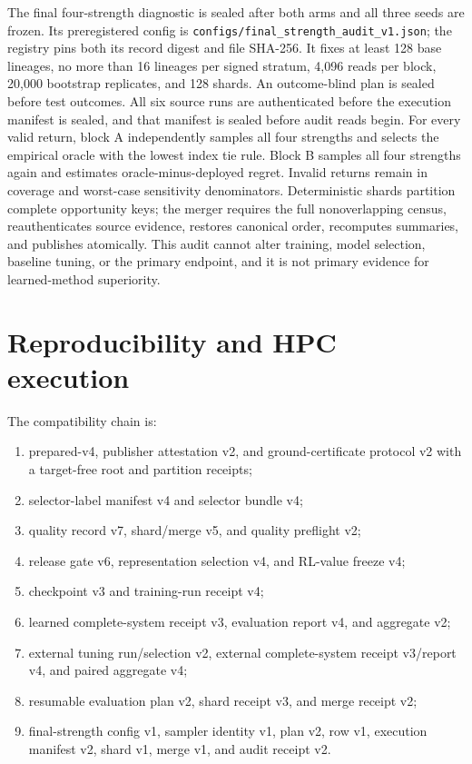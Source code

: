 \documentclass[
  american,
  10pt,
  a4paper,
]{article}
\providecommand{\tightlist}{%
  \setlength{\itemsep}{0pt}\setlength{\parskip}{0pt}}
\begin{document}
The final four-strength diagnostic is sealed after both arms and all
three seeds are frozen. Its preregistered config is
\texttt{configs/final\_strength\_audit\_v1.json}; the registry pins both
its record digest and file SHA-256. It fixes at least 128 base lineages,
no more than 16 lineages per signed stratum, 4,096 reads per block,
20,000 bootstrap replicates, and 128 shards. An outcome-blind plan is
sealed before test outcomes. All six source runs are authenticated
before the execution manifest is sealed, and that manifest is sealed
before audit reads begin. For every valid return, block A independently
samples all four strengths and selects the empirical oracle with the
lowest index tie rule. Block B samples all four strengths again and
estimates oracle-minus-deployed regret. Invalid returns remain in
coverage and worst-case sensitivity denominators. Deterministic shards
partition complete opportunity keys; the merger requires the full
nonoverlapping census, reauthenticates source evidence, restores
canonical order, recomputes summaries, and publishes atomically. This
audit cannot alter training, model selection, baseline tuning, or the
primary endpoint, and it is not primary evidence for learned-method
superiority.

\section{Reproducibility and HPC
execution}\label{reproducibility-and-hpc-execution}

The compatibility chain is:

\begin{enumerate}
\def\labelenumi{\arabic{enumi}.}
\tightlist
\item
  prepared-v4, publisher attestation v2, and ground-certificate protocol
  v2 with a target-free root and partition receipts;
\item
  selector-label manifest v4 and selector bundle v4;
\item
  quality record v7, shard/merge v5, and quality preflight v2;
\item
  release gate v6, representation selection v4, and RL-value freeze v4;
\item
  checkpoint v3 and training-run receipt v4;
\item
  learned complete-system receipt v3, evaluation report v4, and
  aggregate v2;
\item
  external tuning run/selection v2, external complete-system receipt
  v3/report v4, and paired aggregate v4;
\item
  resumable evaluation plan v2, shard receipt v3, and merge receipt v2;
\item
  final-strength config v1, sampler identity v1, plan v2, row v1,
  execution manifest v2, shard v1, merge v1, and audit receipt v2.
\end{enumerate}
\end{document}
